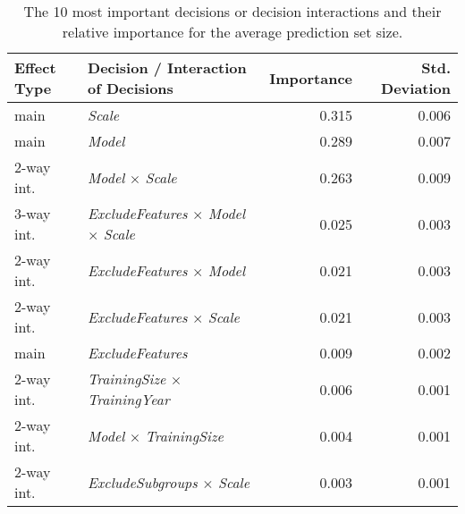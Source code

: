 \begin{table}
\centering
\caption{The 10 most important decisions or decision interactions and their relative importance for the average prediction set size.}
\label{tab:fanova_top10}
\begin{tabular}{llrr}
\toprule
Effect Type &                                      Decision / Interaction of Decisions &  Importance &  Std. Deviation \\
\midrule
       main &                                                           \textit{Scale} &       0.315 &           0.006 \\
       main &                                                           \textit{Model} &       0.289 &           0.007 \\
 2-way int. &                                   \textit{Model} $\times$ \textit{Scale} &       0.263 &           0.009 \\
 3-way int. & \textit{ExcludeFeatures} $\times$ \textit{Model} $\times$ \textit{Scale} &       0.025 &           0.003 \\
 2-way int. &                         \textit{ExcludeFeatures} $\times$ \textit{Model} &       0.021 &           0.003 \\
 2-way int. &                         \textit{ExcludeFeatures} $\times$ \textit{Scale} &       0.021 &           0.003 \\
       main &                                                 \textit{ExcludeFeatures} &       0.009 &           0.002 \\
 2-way int. &                     \textit{TrainingSize} $\times$ \textit{TrainingYear} &       0.006 &           0.001 \\
 2-way int. &                            \textit{Model} $\times$ \textit{TrainingSize} &       0.004 &           0.001 \\
 2-way int. &                        \textit{ExcludeSubgroups} $\times$ \textit{Scale} &       0.003 &           0.001 \\
\bottomrule
\end{tabular}
\end{table}
